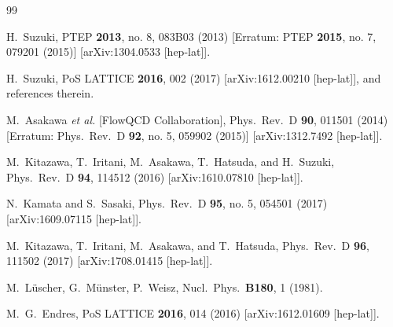 \documentclass[3p,twocolumn,sort&compress]{elsarticle}
\begin{document}
\begin{thebibliography}{99}

  H.~Suzuki,
  PTEP {\bf 2013}, no. 8, 083B03 (2013)
   [Erratum: PTEP {\bf 2015}, no. 7, 079201 (2015)]
   [arXiv:1304.0533 [hep-lat]].

  H.~Suzuki,
  PoS LATTICE {\bf 2016}, 002 (2017)
  [arXiv:1612.00210 [hep-lat]], and references therein.


  M.~Asakawa {\it et al.} [FlowQCD Collaboration],
  Phys.\ Rev.\ D {\bf 90}, 011501 (2014)
  [Erratum: Phys.\ Rev.\ D {\bf 92}, no. 5, 059902 (2015)]
  [arXiv:1312.7492 [hep-lat]].

  M.~Kitazawa, T.~Iritani, M.~Asakawa, T.~Hatsuda, and H.~Suzuki,
  Phys.\ Rev.\ D {\bf 94}, 114512 (2016)
  [arXiv:1610.07810 [hep-lat]].

  N.~Kamata and S.~Sasaki,
  Phys.\ Rev.\ D {\bf 95}, no. 5, 054501 (2017)
  [arXiv:1609.07115 [hep-lat]].

  M.~Kitazawa, T.~Iritani, M.~Asakawa, and T.~Hatsuda,
  Phys.\ Rev.\ D {\bf 96}, 111502 (2017)
  [arXiv:1708.01415 [hep-lat]].

  M.~L\"uscher, G.~M\"unster, P.~Weisz,
  Nucl.\ Phys.\ {\bf B180}, 1 (1981).

  M.~G.~Endres,
  PoS LATTICE {\bf 2016}, 014 (2016)
  [arXiv:1612.01609 [hep-lat]].



\end{thebibliography}
\end{document}
